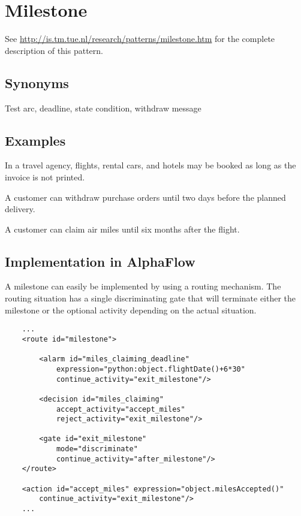 \section{Milestone}

See \url{http://is.tm.tue.nl/research/patterns/milestone.htm} for the complete
description of this pattern.

\subsection{Synonyms}

Test arc, deadline, state condition, withdraw message

\subsection{Examples}

In a travel agency, flights, rental cars, and hotels may be booked as
long as the invoice is not printed. 

A customer can withdraw purchase orders until two days before the
planned delivery. 

A customer can claim air miles until six months after the
flight. 

\subsection{Implementation in AlphaFlow}

A milestone can easily be implemented by using a routing mechanism. The routing
situation has a single discriminating gate that will terminate either the
milestone or the optional activity depending on the actual situation.

\begin{verbatim}
    ...
    <route id="milestone">

        <alarm id="miles_claiming_deadline"
            expression="python:object.flightDate()+6*30"
            continue_activity="exit_milestone"/>

        <decision id="miles_claiming"
            accept_activity="accept_miles"
            reject_activity="exit_milestone"/>

        <gate id="exit_milestone" 
            mode="discriminate"
            continue_activity="after_milestone"/>
    </route>

    <action id="accept_miles" expression="object.milesAccepted()"
        continue_activity="exit_milestone"/>
    ...
\end{verbatim}

